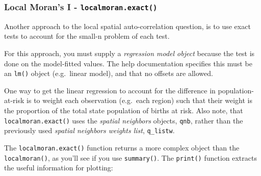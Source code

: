 \documentclass[
]{book}
\newenvironment{Shaded}{\begin{snugshade}}{\end{snugshade}}
\newcommand{\AttributeTok}[1]{\textcolor[rgb]{0.13,0.29,0.53}{#1}}
\newcommand{\CommentTok}[1]{\textcolor[rgb]{0.56,0.35,0.01}{\textit{#1}}}
\newcommand{\DecValTok}[1]{\textcolor[rgb]{0.00,0.00,0.81}{#1}}
\newcommand{\FunctionTok}[1]{\textcolor[rgb]{0.13,0.29,0.53}{\textbf{#1}}}
\newcommand{\NormalTok}[1]{#1}
\newcommand{\OtherTok}[1]{\textcolor[rgb]{0.56,0.35,0.01}{#1}}
\newcommand{\SpecialCharTok}[1]{\textcolor[rgb]{0.81,0.36,0.00}{\textbf{#1}}}
\begin{document}
\hypertarget{local-morans-i---localmoran.exact}{%
\subsubsection{\texorpdfstring{Local Moran's I - \texttt{localmoran.exact()}}{Local Moran's I - localmoran.exact()}}\label{local-morans-i---localmoran.exact}}

Another approach to the local spatial auto-correlation question, is to use exact tests to account for the small-n problem of each test.

For this approach, you must supply a \emph{regression model object} because the test is done on the model-fitted values. The help documentation specifies this must be an \texttt{lm()} object (e.g.~linear model), and that no offsets are allowed.

One way to get the linear regression to account for the difference in population-at-risk is to weight each observation (e.g.~each region) such that their weight is the proportion of the total state population of births at risk. Also note, that \texttt{localmoran.exact()} uses the \emph{spatial neighbors} objects, \texttt{qnb}, rather than the previously used \emph{spatial neighbors weights list}, \texttt{q\_listw}.

\begin{Shaded}
\end{Shaded}

The \texttt{localmoran.exact()} function returns a more complex object than the \texttt{localmoran()}, as you'll see if you use \texttt{summary()}. The \texttt{print()} function extracts the useful information for plotting:
\end{document}
